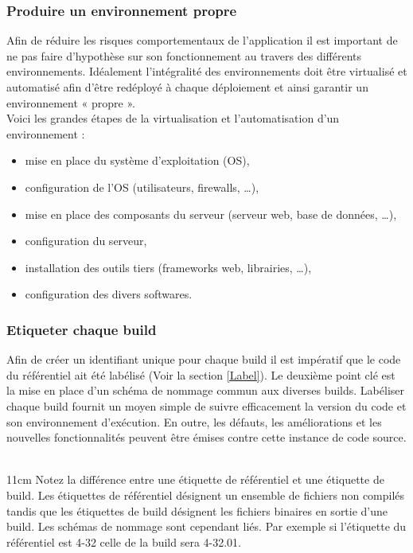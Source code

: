       \subsubsection{Produire un environnement propre}
      Afin de réduire les risques comportementaux de l’application il est important de ne pas faire d’hypothèse sur son fonctionnement au travers des différents environnements. Idéalement l’intégralité des environnements doit être virtualisé et automatisé afin d’être redéployé à chaque déploiement et ainsi garantir un environnement « propre ».\\
      Voici les grandes étapes de la virtualisation et l’automatisation d’un environnement :\\
      \begin{itemize}
        \item mise en place du système d’exploitation (OS),
        \item configuration de l’OS (utilisateurs, firewalls, …),
        \item mise en place des composants du serveur (serveur web, base de données, …),
        \item configuration du serveur,
        \item installation des outils tiers (frameworks web, librairies, …),
        \item	configuration des divers softwares.\\
      \end{itemize}

      \subsubsection{Etiqueter chaque build}
      Afin de créer un identifiant unique pour chaque build il est impératif que le code du référentiel ait été labélisé (Voir la section \ref{Label}). Le deuxième point clé est la mise en place d’un schéma de nommage commun aux diverses builds. Labéliser chaque build fournit un moyen simple de suivre efficacement la version du code et son environnement d’exécution. En outre, les défauts, les améliorations et les nouvelles fonctionnalités peuvent être émises contre cette instance de code source.\\\\

      \begin {boxedminipage} {11cm}
        Notez la différence entre une étiquette de référentiel et une étiquette de build. Les étiquettes de référentiel désignent un ensemble de fichiers non compilés tandis que les étiquettes de build désignent les fichiers binaires en sortie d’une build. Les schémas de nommage sont cependant liés. Par exemple si l’étiquette du référentiel est 4-32 celle de la build sera 4-32.01.
      \end {boxedminipage}\\

